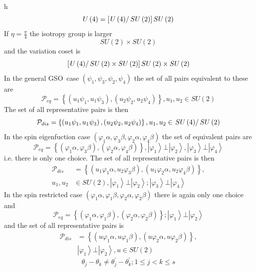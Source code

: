 \documentclass[aps,preprint]{revtex4}%
\begin{document}
h
\[
U\left(  4\right)  =\left[  \left.  U\left(  4\right)  \right/  SU\left(
2\right)  \right]  SU\left(  2\right)
\]
If $\eta=\frac{\pi}{4}$ the isotropy group is larger
\[
SU\left(  2\right)  \times SU\left(  2\right)
\]
and the variation coset is
\[
\left[  \left.  U\left(  4\right)  \right/  SU\left(  2\right)  \times
SU\left(  2\right)  \right]  SU\left(  2\right)  \times SU\left(  2\right)
\]
In the general GSO\ case $\left(  \psi_{1},\psi_{3},\psi_{2},\psi_{4}\right)
$ the set of all pairs equivalent to these are
\[
\mathcal{P}_{eq}=\left\{  \left(  u_{1}\psi_{1},u_{1}\psi_{3}\right)  ,\left(
u_{2}\psi_{2},u_{2}\psi_{4}\right)  \right\}  ,u_{1},u_{2}\in SU\left(
2\right)
\]
The set of all representative pairs is then
\[
\mathcal{P}_{dis}=\left\{  \left(  u_{1}\psi_{1},u_{1}\psi_{3}\right)
,\left(  u_{2}\psi_{2},u_{2}\psi_{4}\right)  \right\}  ,u_{1},u_{2}\in\left.
SU\left(  4\right)  \right/  SU\left(  2\right)
\]
In the spin eigenfuction case $\left(  \varphi_{1}\alpha,\varphi_{3}%
\beta,\varphi_{2}\alpha,\varphi_{4}\beta\right)  $ the set of equivalent pairs
are
\[
\mathcal{P}_{eq}=\left\{  \left(  \varphi_{1}\alpha,\varphi_{3}\beta\right)
,\left(  \varphi_{2}\alpha,\varphi_{4}\beta\right)  \right\}  ,\left\vert
\varphi_{1}\right\rangle \bot\left\vert \varphi_{2}\right\rangle ,\left\vert
\varphi_{3}\right\rangle \bot\left\vert \varphi_{4}\right\rangle
\]
i.e. there is only one choice. The set of all representative pairs is then%
\begin{align*}
\mathcal{P}_{dis}  &  =\left\{  \left(  u_{1}\varphi_{1}\alpha,u_{2}%
\varphi_{3}\beta\right)  ,\left(  u_{1}\varphi_{2}\alpha,u_{2}\varphi_{4}%
\beta\right)  \right\}  ,\\
u_{1},u_{2}  &  \in SU\left(  2\right)  ,\left\vert \varphi_{1}\right\rangle
\bot\left\vert \varphi_{2}\right\rangle ;\left\vert \varphi_{3}\right\rangle
\bot\left\vert \varphi_{4}\right\rangle
\end{align*}
In the spin restricted case $\left(  \varphi_{1}\alpha,\varphi_{1}%
\beta,\varphi_{2}\alpha,\varphi_{2}\beta\right)  $ there is again only one
choice and
\[
\mathcal{P}_{eq}=\left\{  \left(  \varphi_{1}\alpha,\varphi_{1}\beta\right)
,\left(  \varphi_{2}\alpha,\varphi_{2}\beta\right)  \right\}  ;\left\vert
\varphi_{1}\right\rangle \bot\left\vert \varphi_{2}\right\rangle
\]
and the set of all representative pairs is%
\begin{align*}
\mathcal{P}_{dis}  &  =\left\{  \left(  u\varphi_{1}\alpha,u\varphi_{1}%
\beta\right)  ,\left(  u\varphi_{2}\alpha,u\varphi_{2}\beta\right)  \right\}
,\\
&  \left\vert \varphi_{1}\right\rangle \bot\left\vert \varphi_{2}\right\rangle
,u\in SU\left(  2\right)
\end{align*}%
\[
\theta_{j}-\theta_{k}\neq\theta_{j}^{\prime}-\theta_{k}^{\prime};1\leq j<k\leq
s
\]
\end{document}
